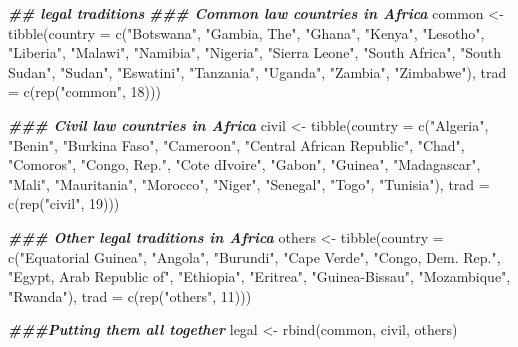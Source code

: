 \documentclass[a4paper,nobind]{templates/ociamthesis}
\newenvironment{Shaded}{\begin{snugshade}}{\end{snugshade}}
\newcommand{\AttributeTok}[1]{\textcolor[rgb]{0.77,0.63,0.00}{#1}}
\newcommand{\DecValTok}[1]{\textcolor[rgb]{0.00,0.00,0.81}{#1}}
\newcommand{\DocumentationTok}[1]{\textcolor[rgb]{0.56,0.35,0.01}{\textbf{\textit{#1}}}}
\newcommand{\FunctionTok}[1]{\textcolor[rgb]{0.00,0.00,0.00}{#1}}
\newcommand{\NormalTok}[1]{#1}
\newcommand{\OtherTok}[1]{\textcolor[rgb]{0.56,0.35,0.01}{#1}}
\newcommand{\StringTok}[1]{\textcolor[rgb]{0.31,0.60,0.02}{#1}}
\renewenvironment{Shaded}
{
  \vspace{10pt}%
  \begin{snugshade}%
}{%
  \end{snugshade}%
  \vspace{8pt}%
}
\begin{document}
\begin{Shaded}
\begin{Highlighting}[]
\DocumentationTok{\#\# legal traditions }
\DocumentationTok{\#\#\# Common law countries in Africa}
\NormalTok{common }\OtherTok{\textless{}{-}} \FunctionTok{tibble}\NormalTok{(}\AttributeTok{country =} \FunctionTok{c}\NormalTok{(}\StringTok{"Botswana"}\NormalTok{, }\StringTok{"Gambia, The"}\NormalTok{, }\StringTok{"Ghana"}\NormalTok{, }\StringTok{"Kenya"}\NormalTok{, }\StringTok{"Lesotho"}\NormalTok{, }\StringTok{"Liberia"}\NormalTok{, }\StringTok{"Malawi"}\NormalTok{, }\StringTok{"Namibia"}\NormalTok{, }\StringTok{"Nigeria"}\NormalTok{, }\StringTok{"Sierra Leone"}\NormalTok{, }\StringTok{"South Africa"}\NormalTok{, }\StringTok{"South Sudan"}\NormalTok{, }\StringTok{"Sudan"}\NormalTok{, }\StringTok{"Eswatini"}\NormalTok{, }\StringTok{"Tanzania"}\NormalTok{, }\StringTok{"Uganda"}\NormalTok{, }\StringTok{"Zambia"}\NormalTok{, }\StringTok{"Zimbabwe"}\NormalTok{), }\AttributeTok{trad =} \FunctionTok{c}\NormalTok{(}\FunctionTok{rep}\NormalTok{(}\StringTok{"common"}\NormalTok{, }\DecValTok{18}\NormalTok{)))}

\DocumentationTok{\#\#\# Civil law countries in Africa}
\NormalTok{civil }\OtherTok{\textless{}{-}} \FunctionTok{tibble}\NormalTok{(}\AttributeTok{country =} \FunctionTok{c}\NormalTok{(}\StringTok{"Algeria"}\NormalTok{, }\StringTok{"Benin"}\NormalTok{, }\StringTok{"Burkina Faso"}\NormalTok{, }\StringTok{"Cameroon"}\NormalTok{, }\StringTok{"Central African Republic"}\NormalTok{, }\StringTok{"Chad"}\NormalTok{, }\StringTok{"Comoros"}\NormalTok{, }\StringTok{"Congo, Rep."}\NormalTok{, }\StringTok{"Cote d\textquotesingle{}Ivoire"}\NormalTok{, }\StringTok{"Gabon"}\NormalTok{, }\StringTok{"Guinea"}\NormalTok{, }\StringTok{"Madagascar"}\NormalTok{, }\StringTok{"Mali"}\NormalTok{, }\StringTok{"Mauritania"}\NormalTok{, }\StringTok{"Morocco"}\NormalTok{, }\StringTok{"Niger"}\NormalTok{, }\StringTok{"Senegal"}\NormalTok{, }\StringTok{"Togo"}\NormalTok{, }\StringTok{"Tunisia"}\NormalTok{), }\AttributeTok{trad =} \FunctionTok{c}\NormalTok{(}\FunctionTok{rep}\NormalTok{(}\StringTok{"civil"}\NormalTok{, }\DecValTok{19}\NormalTok{)))}

\DocumentationTok{\#\#\# Other legal traditions in Africa}
\NormalTok{others }\OtherTok{\textless{}{-}} \FunctionTok{tibble}\NormalTok{(}\AttributeTok{country =} \FunctionTok{c}\NormalTok{(}\StringTok{"Equatorial Guinea"}\NormalTok{, }\StringTok{"Angola"}\NormalTok{, }\StringTok{"Burundi"}\NormalTok{, }\StringTok{"Cape Verde"}\NormalTok{, }\StringTok{"Congo, Dem. Rep."}\NormalTok{, }\StringTok{"Egypt, Arab Republic of"}\NormalTok{, }\StringTok{"Ethiopia"}\NormalTok{, }\StringTok{"Eritrea"}\NormalTok{, }\StringTok{"Guinea{-}Bissau"}\NormalTok{, }\StringTok{"Mozambique"}\NormalTok{, }\StringTok{"Rwanda"}\NormalTok{), }\AttributeTok{trad =} \FunctionTok{c}\NormalTok{(}\FunctionTok{rep}\NormalTok{(}\StringTok{"others"}\NormalTok{, }\DecValTok{11}\NormalTok{)))}

\DocumentationTok{\#\#\#Putting them all together}
\NormalTok{legal }\OtherTok{\textless{}{-}} \FunctionTok{rbind}\NormalTok{(common, civil, others)}
\end{Highlighting}
\end{Shaded}
\end{document}
